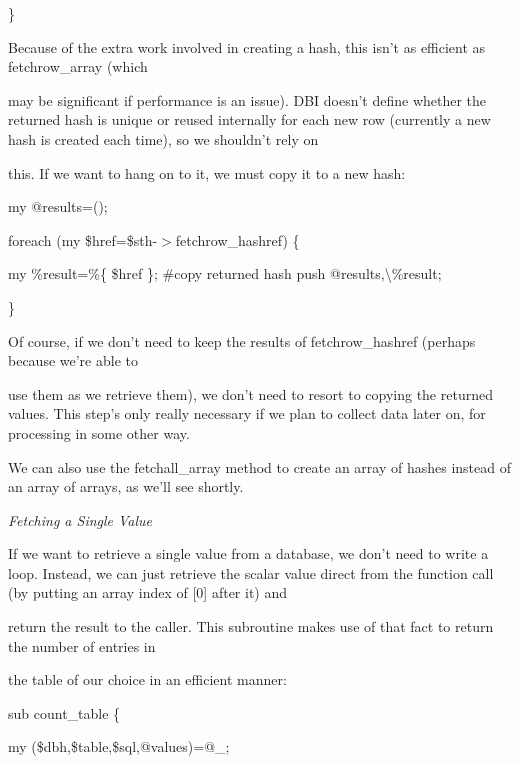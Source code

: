 \documentclass[a4paper,11pt]{book}
\begin{document}
\noindent \}

\noindent 

\noindent Because of the extra work involved in creating a hash, this isn't as efficient as fetchrow\_array (which

\noindent may be significant if performance is an issue). DBI doesn't define whether the returned hash is unique or reused internally for each new row (currently a new hash is created each time), so we shouldn't rely on

\noindent this. If we want to hang on to it, we must copy it to a new hash:

\noindent 

\noindent my @results=();

\noindent foreach (my \$href=\$sth-$>$fetchrow\_hashref) \{

\noindent my \%result=\%\{ \$href \}; \#copy returned hash push @results,\textbackslash \%result;

\noindent \}

\noindent 

\noindent 

\noindent Of course, if we don't need to keep the results of fetchrow\_hashref (perhaps because we're able to

\noindent use them as we retrieve them), we don't need to resort to copying the returned values. This step's only really necessary if we plan to collect data later on, for processing in some other way.

\noindent 

\noindent We can also use the fetchall\_array method to create an array of hashes instead of an array of arrays, as we'll see shortly.

\noindent 

\noindent \textit{Fetching a Single Value}

\noindent If we want to retrieve a single value from a database, we don't need to write a loop. Instead, we can just retrieve the scalar value direct from the function call (by putting an array index of [0] after it) and

\noindent return the result to the caller. This subroutine makes use of that fact to return the number of entries in

\noindent the table of our choice in an efficient manner:

\noindent 

\noindent sub count\_table \{

\noindent my (\$dbh,\$table,\$sql,@values)=@\_;
\end{document}
